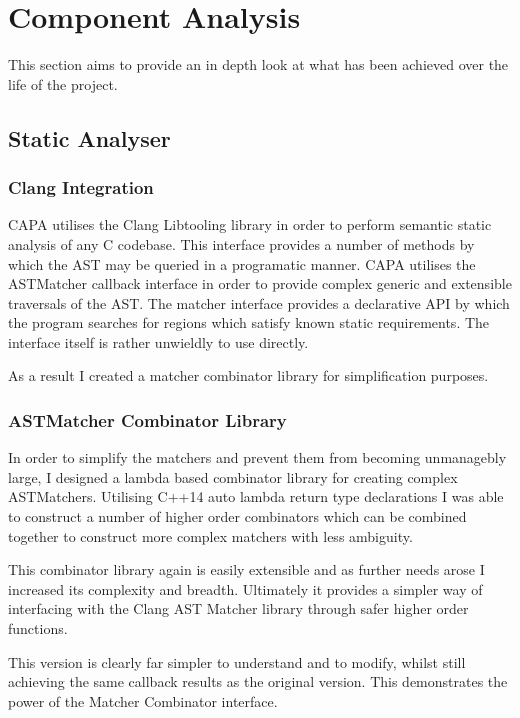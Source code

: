 
\section{Component Analysis}

This section aims to provide an in depth look at what has been achieved over the life of the
project.

\subsection{Static Analyser}

\subsubsection{Clang Integration}
CAPA utilises the Clang Libtooling library in order to perform semantic static analysis of any C
codebase. This interface provides a number of methods by which the AST may be queried in a
programatic manner. CAPA utilises the ASTMatcher callback interface in order to provide complex
generic and extensible traversals of the AST. The matcher interface provides a declarative API by
which the program searches for regions which satisfy known static requirements. The interface itself
is rather unwieldly to use directly. 

As a result I created a matcher combinator library for simplification purposes.

\subsubsection{ASTMatcher Combinator Library}
In order to simplify the matchers and prevent them from becoming unmanagebly large, I designed a
lambda based combinator library for creating complex ASTMatchers. Utilising C++14 auto lambda return type
declarations I was able to construct a number of higher order combinators which can be combined
together to construct more complex matchers with less ambiguity.

This combinator library again is easily extensible and as further needs arose I increased its
complexity and breadth. Ultimately it provides a simpler way of interfacing with the Clang AST
Matcher library through safer higher order functions.

This version is clearly far simpler to understand and to modify, whilst still achieving the same
callback results as the original version. This demonstrates the power of the Matcher Combinator
interface.


